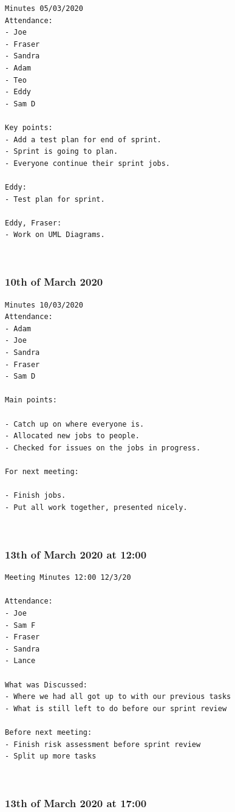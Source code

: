 \documentclass[10pt, notitlepage]{report}
\begin{document}
\begin{lstlisting}
Minutes 05/03/2020
Attendance:
- Joe
- Fraser
- Sandra
- Adam
- Teo
- Eddy
- Sam D

Key points:
- Add a test plan for end of sprint.
- Sprint is going to plan.
- Everyone continue their sprint jobs.

Eddy:
- Test plan for sprint.

Eddy, Fraser:
- Work on UML Diagrams.
\end{lstlisting}

\leavevmode \\
\subsubsection{10th of March 2020}

\begin{lstlisting}
Minutes 10/03/2020
Attendance:
- Adam
- Joe
- Sandra
- Fraser
- Sam D

Main points:

- Catch up on where everyone is.
- Allocated new jobs to people.
- Checked for issues on the jobs in progress.

For next meeting:

- Finish jobs.
- Put all work together, presented nicely.
\end{lstlisting}

\leavevmode \\
\subsubsection{13th of March 2020 at 12:00}

\begin{lstlisting}
Meeting Minutes 12:00 12/3/20

Attendance:
- Joe
- Sam F
- Fraser
- Sandra
- Lance

What was Discussed:
- Where we had all got up to with our previous tasks
- What is still left to do before our sprint review

Before next meeting:
- Finish risk assessment before sprint review
- Split up more tasks
\end{lstlisting}

\leavevmode \\
\subsubsection{13th of March 2020 at 17:00}
\end{document}
